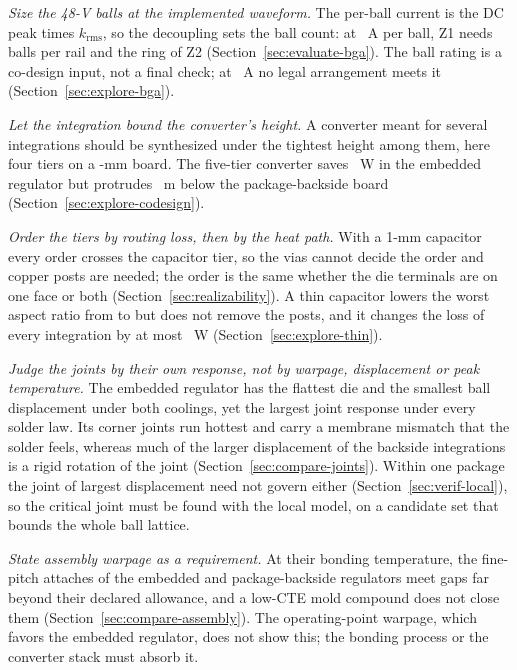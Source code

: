 \emph{Size the 48-V balls at the implemented waveform.} The per-ball current is the DC peak times
$k_{\mathrm{rms}}$, so the decoupling sets the ball count: at \WrBgaRule~A per ball, Z1 needs
\WrBgaNZone{} balls per rail and the ring of Z2 \WrBgaNZtwo{} (Section~\ref{sec:evaluate-bga}). The
ball rating is a co-design input, not a final check; at \WrBgaRuleSens~A no legal arrangement meets
it (Section~\ref{sec:explore-bga}).

\emph{Let the integration bound the converter's height.} A converter meant for several
integrations should be synthesized under the tightest height among them, here four tiers on a
\FrBoardMm-mm board. The five-tier converter saves \WrFiveAZonedPAbs~W in the embedded regulator
but protrudes \FrProtrudeTfive~\textmu m below the package-backside board
(Section~\ref{sec:explore-codesign}).

\emph{Order the tiers by routing loss, then by the heat path.} With a 1-mm capacitor every order
crosses the capacitor tier, so the vias cannot decide the order and copper posts are needed; the
order is the same whether the die terminals are on one face or both
(Section~\ref{sec:realizability}). A thin capacitor lowers the worst aspect ratio from
\MthWorstAR{} to \MthThinAR{} but does not remove the posts, and it changes the loss of every
integration by at most \WrThinDPAbsMax~W (Section~\ref{sec:explore-thin}).

\emph{Judge the joints by their own response, not by warpage, displacement or peak temperature.}
The embedded regulator has the flattest die and the smallest ball displacement under both coolings,
yet the largest joint response under every solder law. Its corner joints run hottest and carry a
membrane mismatch that the solder feels, whereas much of the larger displacement of the backside
integrations is a rigid rotation of the joint (Section~\ref{sec:compare-joints}). Within one package
the joint of largest displacement need not govern either (Section~\ref{sec:verif-local}), so the
critical joint must be found with the local model, on a candidate set that bounds the whole ball
lattice.

\emph{State assembly warpage as a requirement.} At their bonding temperature, the fine-pitch
attaches of the embedded and package-backside regulators meet gaps far beyond their declared
allowance, and a low-CTE mold compound does not close them (Section~\ref{sec:compare-assembly}).
The operating-point warpage, which favors the embedded regulator, does not show this; the bonding
process or the converter stack must absorb it.

